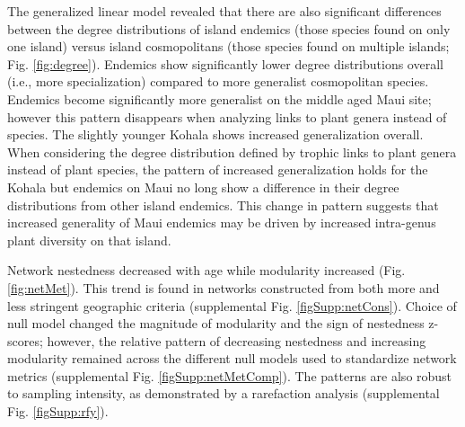 \documentclass[12pt]{article}
\begin{document}
\begin{linenumbers}
The generalized linear model revealed that there are also significant
differences between the degree distributions of island endemics (those
species found on only one island) versus island cosmopolitans (those
species found on multiple islands; Fig. \ref{fig:degree}). Endemics
show significantly lower degree distributions overall (i.e., more
specialization) compared to more generalist cosmopolitan
species. Endemics become significantly more generalist on the middle
aged Maui site; however this pattern disappears when analyzing links
to plant genera instead of species. The slightly younger Kohala shows
increased generalization overall. When considering the degree
distribution defined by trophic links to plant genera instead of plant
species, the pattern of increased generalization holds for the Kohala
but endemics on Maui no long show a difference in their degree
distributions from other island endemics. This change in pattern
suggests that increased generality of Maui endemics may be driven by
increased intra-genus plant diversity on that island.

Network nestedness decreased with age while modularity increased
(Fig. \ref{fig:netMet}). This trend is found in networks constructed
from both more and less stringent geographic criteria (supplemental
Fig.  \ref{figSupp:netCons}). Choice of null model changed the
magnitude of modularity and the sign of nestedness z-scores; however,
the relative pattern of decreasing nestedness and increasing
modularity remained across the different null models used to
standardize network metrics (supplemental
Fig. \ref{figSupp:netMetComp}). The patterns are also robust to
sampling intensity, as demonstrated by a rarefaction analysis
(supplemental Fig. \ref{figSupp:rfy}).


\end{linenumbers}
\end{document}
